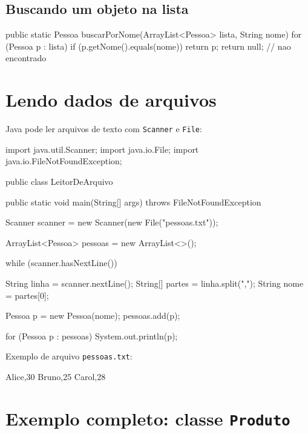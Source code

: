 \documentclass[12pt, a4paper]{article}
\newcommand{\code}[1]{\texttt{\color{javaDeep}#1}}
\begin{document}
\subsection{Buscando um objeto na lista}

\begin{javacode}
public static Pessoa buscarPorNome(ArrayList<Pessoa> lista, String nome) {
    for (Pessoa p : lista) {
        if (p.getNome().equals(nome)) {
            return p;
        }
    }
    return null; // nao encontrado
}
\end{javacode}

\section{Lendo dados de arquivos}

Java pode ler arquivos de texto com \code{Scanner} e \code{File}:

\begin{javacode}
import java.util.Scanner;
import java.io.File;
import java.io.FileNotFoundException;

public class LeitorDeArquivo {
    public static void main(String[] args) throws FileNotFoundException {
        Scanner scanner = new Scanner(new File("pessoas.txt"));

        ArrayList<Pessoa> pessoas = new ArrayList<>();

        while (scanner.hasNextLine()) {
            String linha = scanner.nextLine();
            String[] partes = linha.split(",");
            String nome = partes[0];

            Pessoa p = new Pessoa(nome);
            pessoas.add(p);
        }

        for (Pessoa p : pessoas) {
            System.out.println(p);
        }
    }
}
\end{javacode}

Exemplo de arquivo \code{pessoas.txt}:

\begin{plaincode}
Alice,30
Bruno,25
Carol,28
\end{plaincode}

\section{Exemplo completo: classe \texttt{Produto}}
\end{document}
